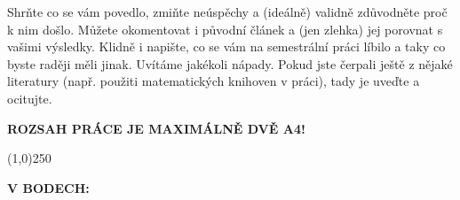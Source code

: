 \documentclass[a4paper,10pt,twocolumn]{article}
\begin{document}
Shrňte co se vám povedlo, zmiňte neúspěchy a (ideálně) validně zdůvodněte proč k nim došlo. Můžete okomentovat i původní článek a (jen zlehka) jej porovnat s vašimi výsledky. Klidně i napište, co se vám na semestrální práci líbilo a taky co byste raději měli jinak. Uvítáme jakékoli nápady. Pokud jste čerpali ještě z nějaké literatury (např. použiti matematických knihoven v práci), tady je uveďte a ocitujte.
%


%



\textbf{ROZSAH PRÁCE JE MAXIMÁLNĚ DVĚ A4!}
%
%
%

%
\vspace{-2mm}
\begin{center}
\line(1,0){250}
\end{center}
\vspace{-2mm}

\textbf{V BODECH:}
\end{document}
